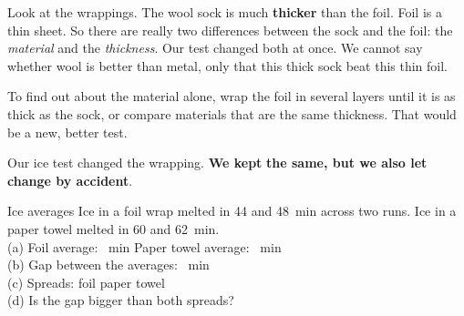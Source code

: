 Look at the wrappings. The wool sock is much \textbf{thicker} than the foil. Foil is a thin sheet. So there are really two differences between the sock and the foil: the \emph{material} and the \emph{thickness}. Our test changed both at once. We cannot say whether wool is better than metal, only that this thick sock beat this thin foil.

\begin{center}
\end{center}

To find out about the material alone, wrap the foil in several layers until it is as thick as the sock, or compare materials that are the same thickness. That would be a new, better test.

\begin{keepbox}
Our ice test changed the wrapping. \textbf{We kept} \wline[3.4cm] \textbf{the same, but we also let} \wline[3.2cm] \textbf{change by accident}.
\end{keepbox}

\clearpage

\begin{puzzle}{Ice averages}
Ice in a foil wrap melted in 44 and 48~min across two runs. Ice in a paper towel melted in 60 and 62~min.\\
(a) Foil average: \wline[1.4cm]~min \quad Paper towel average: \wline[1.4cm]~min\\
(b) Gap between the averages: \wline[1.4cm]~min\\
(c) Spreads: foil \wline[1.2cm] paper towel \wline[1.2cm]\\
(d) Is the gap bigger than both spreads? \wline[2cm]
\end{puzzle}

